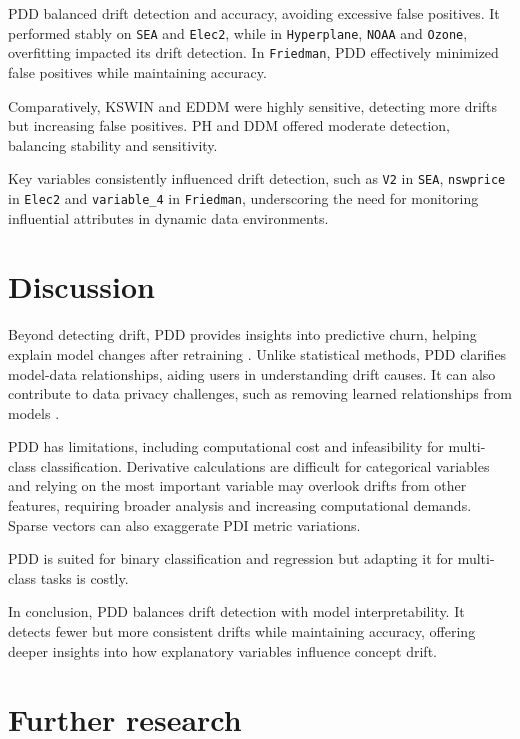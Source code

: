 PDD balanced drift detection and accuracy, avoiding excessive false positives. It performed stably on \texttt{SEA} and \texttt{Elec2}, while in \texttt{Hyperplane}, \texttt{NOAA} and \texttt{Ozone}, overfitting impacted its drift detection. In \texttt{Friedman}, PDD effectively minimized false positives while maintaining accuracy.

Comparatively, KSWIN and EDDM were highly sensitive, detecting more drifts but increasing false positives. PH and DDM offered moderate detection, balancing stability and sensitivity.

Key variables consistently influenced drift detection, such as \texttt{V2} in \texttt{SEA}, \texttt{nswprice} in \texttt{Elec2} and \texttt{variable\_4} in \texttt{Friedman}, underscoring the need for monitoring influential attributes in dynamic data environments.

\hypertarget{discussion}{%
\section{Discussion}\label{discussion}}

Beyond detecting drift, PDD provides insights into predictive churn, helping explain model changes after retraining \citep{daniels_2024}. Unlike statistical methods, PDD clarifies model-data relationships, aiding users in understanding drift causes. It can also contribute to data privacy challenges, such as removing learned relationships from models \citep{bourtoule_2021}.

PDD has limitations, including computational cost and infeasibility for multi-class classification. Derivative calculations are difficult for categorical variables and relying on the most important variable may overlook drifts from other features, requiring broader analysis and increasing computational demands. Sparse vectors can also exaggerate PDI metric variations.

PDD is suited for binary classification and regression but adapting it for multi-class tasks is costly.

In conclusion, PDD balances drift detection with model interpretability. It detects fewer but more consistent drifts while maintaining accuracy, offering deeper insights into how explanatory variables influence concept drift.

\hypertarget{further-research}{%
\section{Further research}\label{further-research}}

